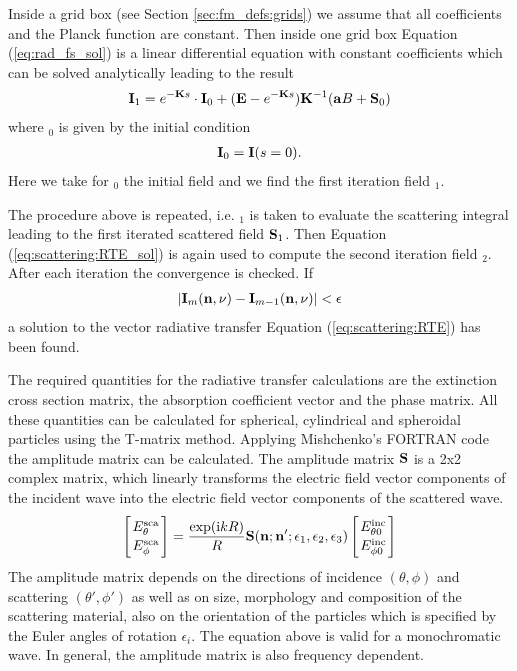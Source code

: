 Inside a  grid box (see Section
\ref{sec:fm_defs:grids}) we assume that all
coefficients and the Planck function are constant. Then inside one
grid box Equation (\ref{eq:rad_fs_sol}) is a linear differential
equation with constant coefficients which can be solved analytically
leading to the result  
\begin{eqnarray}
  \label{eq:scattering:RTE_sol}
  {\bf I}_1 = e^{-{\bf K} s}\cdot{\bf I}_0 + ({\bf E} - e^{-{\bf K}
    s}) {\bf K}^{-1} ({\bf a} B + {\bf S}_0)
\end{eqnarray}
where \StoVec$_0$ is given by the initial condition
\begin{eqnarray}
  {\bf I}_0 =  {\bf I}(s = 0).
\end{eqnarray}
Here we take for \StoVec$_0$ the initial field and we find the first
iteration field \StoVec$_1$.

\label{sec:scattering:conv}

The procedure above is repeated, i.e. \StoVec$_1$ is taken to evaluate
the scattering integral leading to the first iterated scattered field
${\bf S}_1$. Then Equation (\ref{eq:scattering:RTE_sol}) is again used to
compute the
second iteration field \StoVec$_2$. \\
After each iteration the convergence is checked. If 
\begin{eqnarray}
|{\bf I}_m ({\bf n}, \nu) -  {\bf I}_{m-1} ({\bf n}, \nu)| < {\bf \epsilon}
\end{eqnarray}
a solution to the vector radiative transfer Equation (\ref{eq:scattering:RTE})
has been
found.

\label{sec:scattering:database}

The required quantities for the radiative transfer calculations are
the  extinction cross section matrix, the
absorption coefficient vector and the phase
matrix. All these quantities can be calculated for spherical,
cylindrical and spheroidal particles using the T-matrix
method. Applying Mishchenko's FORTRAN code%
the amplitude matrix can be calculated. The
amplitude matrix ${\bf S}$ is a 2x2 complex matrix, which linearly transforms 
the electric field vector components of the incident wave into the
electric field vector components of the scattered wave.  
\begin{eqnarray}
  \label{eq:ampl_matrix}
  \left[{E^{\rm sca}_{\theta}\atop E^{\rm sca}_{\phi}}\right] =
  \frac{\exp({\rm i} kR)}{R}{\bf S}({\bf n};{\bf
      n'};\epsilon_1,\epsilon_2,\epsilon_3)\left[{E^{\rm inc}_{\theta
          0}\atop E^{\rm inc}_{\phi 0}}\right] 
\end{eqnarray}
The amplitude matrix depends on the directions of incidence  $(\theta,
\phi)$  and
scattering $(\theta', \phi')$ as  well as on size, morphology and composition of the
scattering material, also on the orientation of the particles which
is specified by the Euler angles of rotation $\epsilon _i$. 
The equation above is valid for a monochromatic wave. In general, the
amplitude matrix is also frequency dependent.

